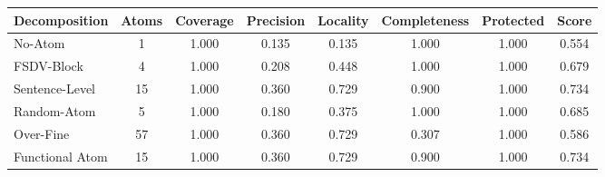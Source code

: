 \begin{tabular}{lccccccc}
\toprule
Decomposition & Atoms & Coverage & Precision & Locality & Completeness & Protected & Score \\
\midrule
No-Atom & 1 & 1.000 & 0.135 & 0.135 & 1.000 & 1.000 & 0.554 \\
FSDV-Block & 4 & 1.000 & 0.208 & 0.448 & 1.000 & 1.000 & 0.679 \\
Sentence-Level & 15 & 1.000 & 0.360 & 0.729 & 0.900 & 1.000 & 0.734 \\
Random-Atom & 5 & 1.000 & 0.180 & 0.375 & 1.000 & 1.000 & 0.685 \\
Over-Fine & 57 & 1.000 & 0.360 & 0.729 & 0.307 & 1.000 & 0.586 \\
Functional Atom & 15 & 1.000 & 0.360 & 0.729 & 0.900 & 1.000 & 0.734 \\
\bottomrule
\end{tabular}
